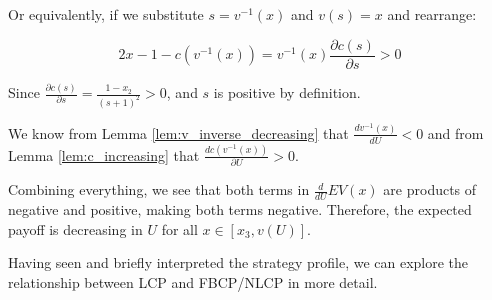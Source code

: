\documentclass[../../main/main.tex]{subfiles}
\begin{document}
\begin{customproof}
    Or equivalently, if we substitute $s= v^{-1}(x)$ and $v(s) = x$ and rearrange:

    $$ 2x -1 -c(v^{-1}(x)) = v^{-1}(x) \frac{\partial c(s)}{\partial s} > 0$$

    Since $\frac{\partial c(s)}{\partial s} = \frac{1-x_2}{(s+1)^2} > 0$, and $s$ is positive by definition.

    We know from Lemma \ref{lem:v_inverse_decreasing} that $\frac{d v^{-1}(x)}{d U} < 0$ and from Lemma \ref{lem:c_increasing} that $\frac{d c(v^{-1}(x))}{\partial U} > 0$.

    Combining everything, we see that both terms in $\frac{d}{dU} EV(x)$ are products of negative and positive, making both terms negative. Therefore, the expected payoff is decreasing in $U$ for all $x \in [x_3, v(U)]$.

    

    
    
    
    
    
    

    

\end{customproof}





Having seen and briefly interpreted the strategy profile, we can explore the relationship between LCP and FBCP/NLCP in more detail.
\end{document}
